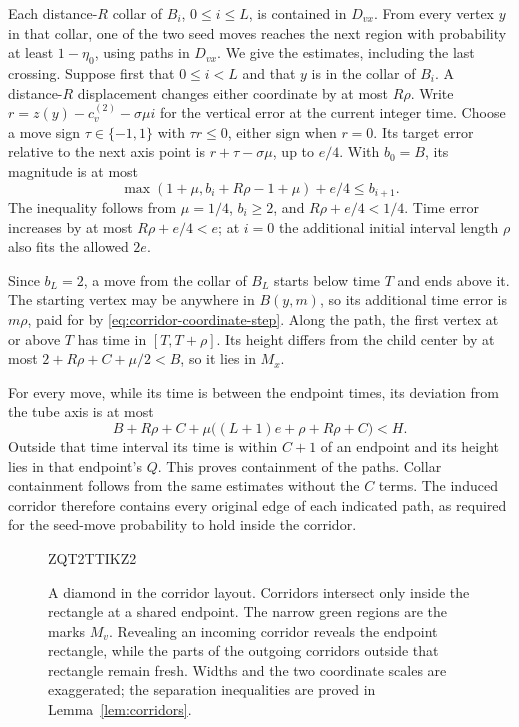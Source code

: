 \documentclass[11pt]{article}
\theoremstyle{definition}
\begin{document}
Each distance-$R$ collar of $B_i$, $0\le i\le L$, is contained in
$D_{vx}$. From every vertex $y$ in that collar, one of the two seed
moves reaches the next region with probability at least $1-\eta_0$,
using paths in $D_{vx}$. We give the estimates, including the last
crossing. Suppose first that $0\le i<L$ and that $y$ is in the
collar of $B_i$. A distance-$R$ displacement changes either coordinate
by at most $R\rho$. Write
$r=z(y)-c_v^{(2)}-\sigma\mu i$ for the vertical error at the current
integer time. Choose a move sign $\tau\in\{-1,1\}$ with $\tau r\le0$,
either sign when $r=0$. Its target error relative to the next axis
point is $r+\tau-\sigma\mu$, up to $e/4$. With $b_0=B$, its magnitude
is at most
\[
 \max(1+\mu,b_i+R\rho-1+\mu)+e/4\le b_{i+1}.
\]
The inequality follows from $\mu=1/4$, $b_i\ge2$, and
$R\rho+e/4<1/4$. Time error increases by at most $R\rho+e/4<e$;
at $i=0$ the additional initial interval length $\rho$ also fits
the allowed $2e$.

Since $b_L=2$, a move from the collar of $B_L$ starts below time $T$
and ends above it. The starting vertex may be anywhere in $B(y,m)$,
so its additional time error is $m\rho$, paid for by
\eqref{eq:corridor-coordinate-step}. Along the path, the first vertex
at or above $T$ has time in $[T,T+\rho]$. Its height differs from
the child center by at most $2+R\rho+C+\mu/2<B$, so it lies in $M_x$.

For every move, while its time is between the endpoint times, its
deviation from the tube axis is at most
\[
 B+R\rho+C+\mu\bigl((L+1)e+\rho+R\rho+C\bigr)<H.
\]
Outside that time interval its time is within $C+1$ of an endpoint
and its height lies in that endpoint's $Q$. This proves containment
of the paths. Collar containment follows from the same estimates
without the $C$ terms. The induced corridor therefore contains every
original edge of each indicated path, as required for the seed-move
probability to hold inside the corridor.

\begin{figure}[htbp]

ZQT2TTIKZ2
\caption{A diamond in the corridor layout. Corridors intersect only
inside the rectangle at a shared endpoint. The narrow green regions
are the marks $M_v$. Revealing an incoming corridor reveals the
endpoint rectangle, while the parts of the outgoing corridors outside
that rectangle remain fresh. Widths and the two coordinate scales are exaggerated;
the separation inequalities are proved in Lemma~\ref{lem:corridors}.}
\label{fig:corridors}
\end{figure}
\end{document}
